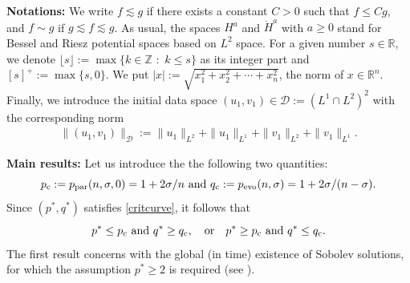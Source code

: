 \documentclass[11pt,reqno]{amsart}
\newcommand{\tron}[1]{\left( #1 \right)}
\numberwithin{equation}{section}
\newcommand{\flo}[1]{\lfloor #1 \rfloor }
\newcommand{\R}{\mathbb{R}}
\newcommand{\Z}{\mathbb{Z}}
\begin{document}
\textbf{Notations:} We write $f\lesssim g$ if there exists a constant $C>0$ such that $f\leq Cg$, and $f \sim g$ if $g\lesssim f\lesssim g$. As usual, the spaces $H^a$ and $\dot{H}^a$ with $a \geq 0$ stand for Bessel and Riesz potential spaces based on $L^2$ space. For a given number $s \in \R$, we denote $\flo{s}:= \max \big\{k \in \Z \,\, : \,\, k\leq s \big\}$ as its integer part and $[s]^{+}:=\max\{s,0\}$. We put $|x|:= \sqrt{x_1^2+x_2^2+\cdots+ x_n^2}$, the norm of $x \in \R^n$. Finally, we introduce the initial data space $(u_1,v_1)\in \mathcal{D}:=\tron{L^1\cap L^2}^2$ with the corresponding norm
\begin{align*}          
\|(u_1,v_1)\|_{\mathcal{D}}:=\|u_1\|_{L^2}+\|u_1\|_{L^1}+\|v_1\|_{L^2}+\|v_1\|_{L^1}.
\end{align*}

\textbf{Main results:} Let us introduce the the following two quantities:
$$ p_{\rm c}:= p_{\mathrm{par}}(n,\sigma,0)= 1 + 2\sigma/n \text{ and }q_{\rm c}:= p_{\mathrm{evo}}(n,\sigma)= 1 + 2\sigma/(n-\sigma). $$
Since $(p^*, q^*)$ satisfies \eqref{critcurve}, it follows that
\[
p^* \leq p_{\rm c} \text{ and } q^* \geq q_{\rm c}, \quad \text{or} \quad p^* \geq p_{\rm c} \text{ and } q^* \leq q_{\rm c}.
\]
The first result concerns with the global (in time) existence of Sobolev solutions, for which the assumption $p^*\geq 2$ is required (see \cite{DuongDaoRei2025}).
\end{document}
